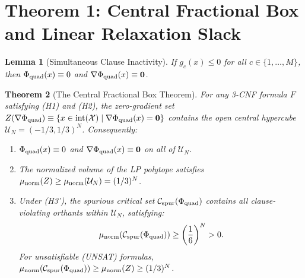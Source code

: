 \documentclass[11pt,a4paper]{article}
\newtheorem{theorem}{Theorem}[section]
\newtheorem{lemma}[theorem]{Lemma}
\begin{document}
\section{Theorem 1: Central Fractional Box and Linear Relaxation Slack}

\begin{lemma}[Simultaneous Clause Inactivity]
\label{lem:inactivity}
If $g_c(x) \leq 0$ for all $c \in \{1, \dots, M\}$, then $\Phi_{\rm quad}(x) \equiv 0$ and $\nabla \Phi_{\rm quad}(x) \equiv \mathbf{0}$.
\end{lemma}

\begin{theorem}[The Central Fractional Box Theorem]
\label{thm:central_box}
For any 3-CNF formula $F$ satisfying (H1) and (H2), the zero-gradient set $Z(\nabla \Phi_{\rm quad}) \equiv \{x \in {\rm int}(\mathcal{X}) \mid \nabla \Phi_{\rm quad}(x) = \mathbf{0}\}$ contains the open central hypercube $\mathcal{U}_N = (-1/3, 1/3)^N$.
Consequently:
\begin{enumerate}
    \item $\Phi_{\rm quad}(x) \equiv 0$ and $\nabla \Phi_{\rm quad}(x) \equiv \mathbf{0}$ on all of $\mathcal{U}_N$.
    \item The normalized volume of the LP polytope satisfies $\mu_{\rm norm}(Z) \ge \mu_{\rm norm}(\mathcal{U}_N) = (1/3)^N$.
    \item Under (H3'), the spurious critical set $\mathcal{C}_{\rm spur}(\Phi_{\rm quad})$ contains all clause-violating orthants within $\mathcal{U}_N$, satisfying:
    \begin{equation}
    \mu_{\rm norm}(\mathcal{C}_{\rm spur}(\Phi_{\rm quad})) \geq \left(\frac{1}{6}\right)^N > 0.
    \end{equation}
    For unsatisfiable (UNSAT) formulas, $\mu_{\rm norm}(\mathcal{C}_{\rm spur}(\Phi_{\rm quad})) \geq \mu_{\rm norm}(Z) \geq (1/3)^N$.
\end{enumerate}
\end{theorem}
\end{document}
